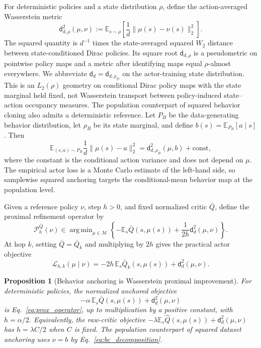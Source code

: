 \documentclass[twoside]{article}
\newtheorem{proposition}{Proposition}
\DeclareMathOperator*{\argmin}{arg\,min}
\begin{document}
For deterministic policies and a state distribution $\rho$, define the
action-averaged Wasserstein metric
\begin{equation}
 \mathsf d_{d,\rho}^2(\mu,\nu)
 :=\mathbb E_{s\sim\rho}
 \left[\frac{1}{d}\|\mu(s)-\nu(s)\|_2^2\right].
 \label{eq:mean_metric}
\end{equation}
The squared quantity is $d^{-1}$ times the state-averaged squared $W_2$
distance between state-conditioned Dirac policies. Its square root
$\mathsf d_{d,\rho}$ is a pseudometric on pointwise policy maps and a metric
after identifying maps equal $\rho$-almost everywhere. We abbreviate
$\mathsf d_d=\mathsf d_{d,\rho_{\mathcal D}}$ on the actor-training state
distribution.
This is an $L_2(\rho)$ geometry on conditional Dirac policy maps with the
state marginal held fixed, not Wasserstein transport between policy-induced
state--action occupancy measures.
The population counterpart of squared behavior cloning also admits a
deterministic reference. Let $P_{\!B}$ be the data-generating behavior
distribution, let $\rho_B$ be its state marginal, and define
$b(s)=\mathbb E_{P_{\!B}}[a\mid s]$. Then
\begin{equation}
 \mathbb E_{(s,a)\sim P_{\!B}}\frac{1}{d}\|\mu(s)-a\|_2^2
 =\mathsf d_{d,\rho_B}^2(\mu,b)+\mathrm{const},
 \label{eq:bc_decomposition}
\end{equation}
where the constant is the conditional action variance and does not depend on
$\mu$. The empirical actor loss is a Monte Carlo estimate of the left-hand
side, so samplewise squared anchoring targets the conditional-mean behavior map
at the population level.

Given a reference policy $\nu$, step $h>0$, and fixed normalized critic
$\bar Q$, define the proximal refinement operator by
\begin{equation}
\mathcal P_{h}^{\bar Q}(\nu)
\in\argmin_{\mu\in\mathcal M}
\left\{-\mathbb E_s\bar Q(s,\mu(s))
+\frac{1}{2h}\mathsf d_d^2(\mu,\nu)\right\}.
\label{eq:prox_operator}
\end{equation}
At hop $k$, setting $\bar Q=\bar Q_k$ and multiplying by $2h$ gives the
practical actor objective
\begin{equation}
\mathcal L_{h,k}(\mu\mid\nu)
=-2h\,\mathbb E_s\bar Q_k(s,\mu(s))
+\mathsf d_d^2(\mu,\nu).
\label{eq:actorloss}
\end{equation}

\begin{proposition}[Behavior anchoring is Wasserstein proximal improvement]
\label{prop:prox_equiv}
For deterministic policies, the normalized anchored objective
\begin{equation*}
 -\alpha\,\mathbb E_s\bar Q(s,\mu(s))
 +\mathsf d_d^2(\mu,\nu)
\end{equation*}
is Eq.~\eqref{eq:prox_operator}, up to multiplication by a positive constant, with
$h=\alpha/2$. Equivalently, the raw-critic objective
$-\lambda\mathbb E_s\widehat Q(s,\mu(s))+\mathsf d_d^2(\mu,\nu)$ has
$h=\lambda C/2$ when $C$ is fixed. The population counterpart of squared
dataset anchoring uses $\nu=b$ by Eq.~\eqref{eq:bc_decomposition}.
\end{proposition}
\end{document}
